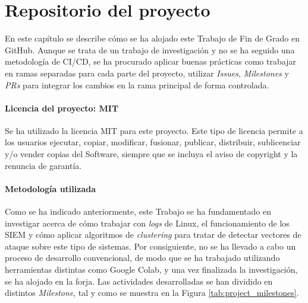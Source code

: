 \chapter{Repositorio del proyecto}


\vspace{-5mm}

En este capítulo se describe cómo se ha alojado este Trabajo de Fin de Grado en GitHub. Aunque se trata de un trabajo de investigación y no se ha seguido una metodología de \gls{CI/CD}, se ha procurado aplicar buenas prácticas como trabajar en ramas separadas para cada parte del proyecto, utilizar \textit{Issues}, \textit{Milestones} y \textit{\gls{PR}s} para integrar los cambios en la rama principal de forma controlada.

\vspace{-2mm}


\subsubsection*{Licencia del proyecto: \gls{MIT}}

Se ha utilizado la licencia MIT \cite{saltzer2020origin} para este proyecto. Este tipo de licencia permite a los usuarios ejecutar, copiar, modificar, fusionar, publicar, distribuir, sublicenciar y/o vender copias del Software, siempre que se incluya el aviso de copyright y la renuncia de garantía. 

\vspace{-2mm}


\subsubsection*{Metodología utilizada}

Como se ha indicado anteriormente, este Trabajo se ha fundamentado en investigar acerca de cómo trabajar con \textit{logs} de Linux, el funcionamiento de los \gls{SIEM} y cómo aplicar algoritmos de \textit{clustering} para tratar de detectar vectores de ataque sobre este tipo de sistemas. Por consiguiente, no se ha llevado a cabo un proceso de desarrollo convencional, de modo que se ha trabajado utilizando herramientas distintas como Google Colab, y una vez finalizada la investigación, se ha alojado en la forja. Las actividades desarrolladas se han dividido en distintos \textit{Milestone}, tal y como se muestra en la Figura \ref{tab:project_milestones}. 

